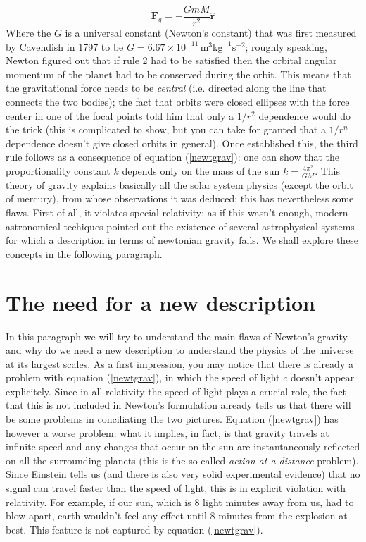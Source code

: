 \begin{equation}
\label{newtgrav}
\mathbf{F}_g=-\frac{GmM}{r^2}\hat{\mathbf{r}}
\end{equation} 
Where the $G$ is a universal constant (Newton's constant) that was first measured by Cavendish in 1797 to be $G=6.67\times 10^{-11}\,\mathrm{m}^3\mathrm{kg}^{-1}\mathrm{s}^{-2}$; roughly speaking, Newton figured out that if rule 2 had to be satisfied then the orbital angular momentum of the planet had to be conserved during the orbit. This means that the gravitational force needs to be \textit{central} (i.e. directed along the line that connects the two bodies); the fact that orbits were closed ellipses with the force center in one of the focal points told him that only a $1/r^2$ dependence would do the trick (this is complicated to show, but you can take for granted that a $1/r^n$ dependence doesn't give closed orbits in general). Once established this, the third rule follows as a consequence of equation (\ref{newtgrav}): one can show that the proportionality constant $k$ depends only on the mass of the sun $k=\frac{4\pi^2}{GM}$. This theory of gravity explains basically all the solar system physics (except 
the orbit of mercury), from whose observations it was deduced; this has nevertheless some flaws. First of all, it violates special relativity; as if this wasn't enough, modern astronomical techiques pointed out the existence of several astrophysical systems for which a description in terms of newtonian gravity fails. We shall explore these concepts in the following paragraph. 

\section{The need for a new description}
In this paragraph we will try to understand the main flaws of Newton's gravity and why do we need a new description to understand the physics of the universe at its largest scales. As a first impression, you may notice that there is already a problem with equation (\ref{newtgrav}), in which the speed of light $c$ doesn't appear explicitely. Since in all relativity the speed of light plays a crucial role, the fact that this is not included in Newton's formulation already tells us that there will be some problems in conciliating the two pictures. Equation (\ref{newtgrav}) has however a worse problem: what it implies, in fact, is that gravity travels at infinite speed and any changes that occur on the sun are instantaneously reflected on all the surrounding planets (this is the so called \textit{action at a distance} problem). Since Einstein tells us (and there is also very solid experimental evidence) that no signal can travel faster than the speed of light, this is in explicit violation with relativity. For 
example, if our sun, which is 8 light minutes away from us, had to blow apart, earth wouldn't feel any effect until 8 minutes from the explosion at best. This feature is not captured by equation (\ref{newtgrav}). 
